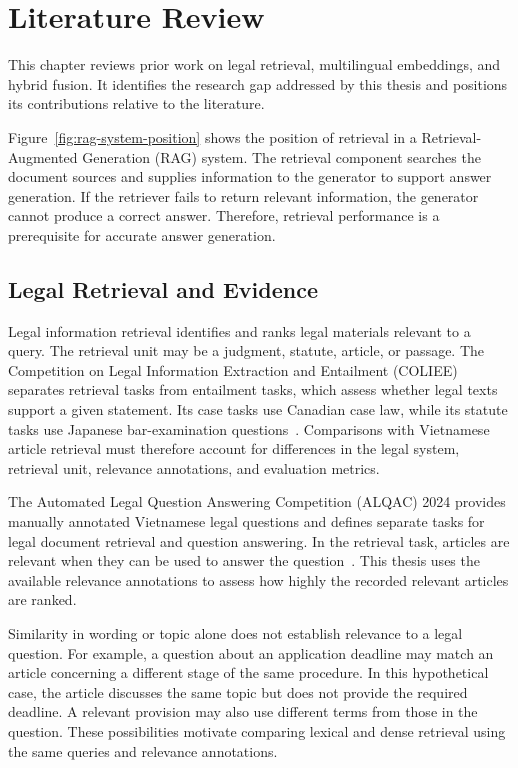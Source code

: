 \chapter{Literature Review}

This chapter reviews prior work on legal retrieval, multilingual embeddings, and hybrid fusion. It identifies the research gap addressed by this thesis and positions its contributions relative to the literature.

Figure~\ref{fig:rag-system-position} shows the position of retrieval in a Retrieval-Augmented Generation (RAG) system. The retrieval component searches the document sources and supplies information to the generator to support answer generation. If the retriever fails to return relevant information, the generator cannot produce a correct answer. Therefore, retrieval performance is a prerequisite for accurate answer generation.



\section{Legal Retrieval and Evidence}

Legal information retrieval identifies and ranks legal materials relevant to a query. The retrieval unit may be a judgment, statute, article, or passage. The Competition on Legal Information Extraction and Entailment (COLIEE) separates retrieval tasks from entailment tasks, which assess whether legal texts support a given statement. Its case tasks use Canadian case law, while its statute tasks use Japanese bar-examination questions~\cite{goebel2024}. Comparisons with Vietnamese article retrieval must therefore account for differences in the legal system, retrieval unit, relevance annotations, and evaluation metrics.

The Automated Legal Question Answering Competition (ALQAC) 2024 provides manually annotated Vietnamese legal questions and defines separate tasks for legal document retrieval and question answering. In the retrieval task, articles are relevant when they can be used to answer the question~\cite{alqac2024}. This thesis uses the available relevance annotations to assess how highly the recorded relevant articles are ranked.

Similarity in wording or topic alone does not establish relevance to a legal question. For example, a question about an application deadline may match an article concerning a different stage of the same procedure. In this hypothetical case, the article discusses the same topic but does not provide the required deadline. A relevant provision may also use different terms from those in the question. These possibilities motivate comparing lexical and dense retrieval using the same queries and relevance annotations.

